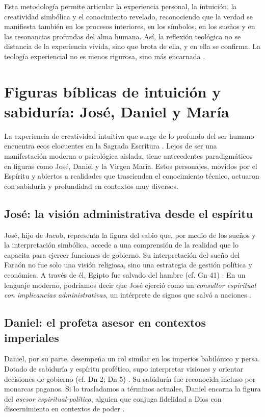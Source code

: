 Esta metodología permite articular la experiencia personal, la intuición, la creatividad simbólica y el conocimiento revelado, reconociendo que la verdad se manifiesta también en los procesos interiores, en los símbolos, en los sueños y en las resonancias profundas del alma humana. Así, la reflexión teológica no se distancia de la experiencia vivida, sino que brota de ella, y en ella se confirma. La teología experiencial no es menos rigurosa, sino más encarnada \cite{jung1959}.

\section*{Figuras bíblicas de intuición y sabiduría: José, Daniel y María}

La experiencia de creatividad intuitiva que surge de lo profundo del ser humano encuentra ecos elocuentes en la Sagrada Escritura \cite{Biblia}. Lejos de ser una manifestación moderna o psicológica aislada, tiene antecedentes paradigmáticos en figuras como José, Daniel y la Virgen María. Estos personajes, movidos por el Espíritu y abiertos a realidades que trascienden el conocimiento técnico, actuaron con sabiduría y profundidad en contextos muy diversos.

\subsection*{José: la visión administrativa desde el espíritu}

José, hijo de Jacob, representa la figura del sabio que, por medio de los sueños y la interpretación simbólica, accede a una comprensión de la realidad que lo capacita para ejercer funciones de gobierno. Su interpretación del sueño del Faraón no fue solo una visión religiosa, sino una estrategia de gestión política y económica. A través de él, Egipto fue salvado del hambre (cf. Gn 41) \cite{Biblia}. En un lenguaje moderno, podríamos decir que José ejerció como un \textit{consultor espiritual con implicancias administrativas}, un intérprete de signos que salvó a naciones \cite{jung1959,jung1971}.

\subsection*{Daniel: el profeta asesor en contextos imperiales}

Daniel, por su parte, desempeña un rol similar en los imperios babilónico y persa. Dotado de sabiduría y espíritu profético, supo interpretar visiones y orientar decisiones de gobierno (cf. Dn 2; Dn 5) \cite{Biblia}. Su sabiduría fue reconocida incluso por monarcas paganos. Si lo trasladamos a términos actuales, Daniel encarna la figura del \textit{asesor espiritual-político}, alguien que conjuga fidelidad a Dios con discernimiento en contextos de poder \cite{jung1959}.

